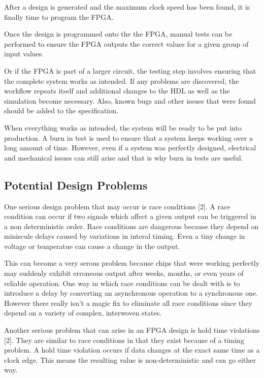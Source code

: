 \documentclass{article}
\begin{document}
    After a design is generated and the maximum clock speed has been found,
    it is finally time to program the FPGA.

    Once the design is programmed onto the the FPGA, manual tests can be performed
    to ensure the FPGA outputs the correct values for a given group of input values.

    Or if the FPGA is part of a larger circuit, the testing step involves ensuring
    that the complete system works as intended. If any problems are discovered,
    the workflow repeats itself and additional changes to the HDL as well as
    the simulation become necessary. Also, known bugs and other issues that were found
    should be added to the specification.

    When everything works as intended, the system will be ready to be put into production.
    A burn in test is used to ensure that a system keeps working over a long amount of time.
    However, even if a system was perfectly designed, electrical and mechanical issues
    can still arise and that is why burn in tests are useful.

    \subsection{Potential Design Problems}

    One serious design problem that may occur is race conditions [2].
    A race condition can occur if two signals which affect a given output
    can be triggered in a non deterministic order. Race conditions are dangerous
    because they depend on miniscule delays caused by variations in interal timing.
    Even a tiny change in voltage or temperatue can cause a change in the output.

    This can become a very serous problem because chips that were working perfectly
    may suddenly exhibit erroneous output after weeks, months, or even years of
    reliable operation. One way in which race conditions can be dealt with
    is to introduce a delay by converting an asynchronous operation to a synchronous one.
    However there really isn't a magic fix to eliminate all race conditions since
    they depend on a variety of complex, interwoven states.

    Another serious problem that can arise in an FPGA design is hold time violations [2].
    They are similar to race conditions in that they exist because of a timing problem.
    A hold time violation occurs if data changes at the exact same time as a clock edge.
    This means the resulting value is non-deterministic and can go either way.
\end{document}
